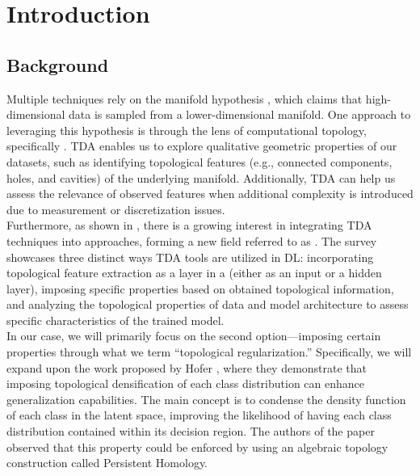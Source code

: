 \documentclass[../main.tex]{subfiles}
\begin{document}
\chapter{Introduction}
\label{ch:introduction}


\section{Background}
\label{sec:background}

Multiple  techniques rely on the manifold hypothesis \cite{fefferman_testing_2016}, which claims that high-dimensional data is sampled from a lower-dimensional manifold. One approach to leveraging this hypothesis is through the lens of computational topology, specifically . TDA enables us to explore qualitative geometric properties of our datasets, such as identifying topological features (e.g., connected components, holes, and cavities) of the underlying manifold. Additionally, TDA can help us assess the relevance of observed features when additional complexity is introduced due to measurement or discretization issues.\\

Furthermore, as shown in \cite{hensel_survey_2021}, there is a growing interest in integrating TDA techniques into  approaches, forming a new field referred to as . The survey showcases three distinct ways TDA tools are utilized in DL: incorporating topological feature extraction as a layer in a  (either as an input or a hidden layer), imposing specific properties based on obtained topological information, and analyzing the topological properties of data and model architecture to assess specific characteristics of the trained model.\\


In our case, we will primarily focus on the second option—imposing certain properties through what we term ``topological regularization.'' Specifically, we will expand upon the work proposed by Hofer \etal \cite{hofer_densified_2021}, where they demonstrate that imposing topological densification of each class distribution can enhance generalization capabilities. The main concept is to condense the density function of each class in the latent space, improving the likelihood of having each class distribution contained within its decision region. The authors of the paper observed that this property could be enforced by using an algebraic topology construction called Persistent Homology.\\
\end{document}

